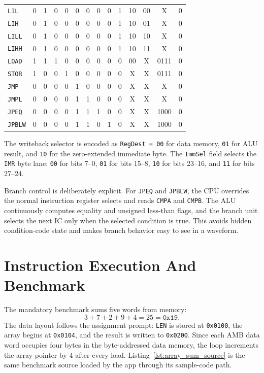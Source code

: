 \documentclass[12pt,a4paper]{article}
\begin{document}
\begin{table}[H]
{\begin{tabular}{lccccccccccccc}
\texttt{LIL}   & 0 & 1 & 0 & 0 & 0 & 0 & 0 & 0 & 1 & 10 & 00 & X    & 0 \\
\texttt{LIH}   & 0 & 1 & 0 & 0 & 0 & 0 & 0 & 0 & 1 & 10 & 01 & X    & 0 \\
\texttt{LILL}  & 0 & 1 & 0 & 0 & 0 & 0 & 0 & 0 & 1 & 10 & 10 & X    & 0 \\
\texttt{LIHH}  & 0 & 1 & 0 & 0 & 0 & 0 & 0 & 0 & 1 & 10 & 11 & X    & 0 \\
\texttt{LOAD}  & 1 & 1 & 1 & 0 & 0 & 0 & 0 & 0 & 0 & 00 & X  & 0111 & 0 \\
\texttt{STOR}  & 1 & 0 & 0 & 1 & 0 & 0 & 0 & 0 & 0 & X  & X  & 0111 & 0 \\
\texttt{JMP}   & 0 & 0 & 0 & 0 & 1 & 0 & 0 & 0 & 0 & X  & X  & X    & 0 \\
\texttt{JMPL}  & 0 & 0 & 0 & 0 & 1 & 1 & 0 & 0 & 0 & X  & X  & X    & 0 \\
\texttt{JPEQ}  & 0 & 0 & 0 & 0 & 1 & 1 & 1 & 0 & 0 & X  & X  & 1000 & 0 \\
\texttt{JPBLW} & 0 & 0 & 0 & 0 & 1 & 1 & 0 & 1 & 0 & X  & X  & 1000 & 0 \\
\bottomrule
\end{tabular}}
\label{tab:rtl_control}
\end{table}

\noindent The writeback selector is encoded as \texttt{RegDest = 00} for data memory, \texttt{01} for ALU result, and \texttt{10} for the zero-extended immediate byte. The \texttt{ImmSel} field selects the \texttt{IMR} byte lane: \texttt{00} for bits 7--0, \texttt{01} for bits 15--8, \texttt{10} for bits 23--16, and \texttt{11} for bits 27--24.

Branch control is deliberately explicit. For \texttt{JPEQ} and \texttt{JPBLW}, the CPU overrides the normal instruction register selects and reads \texttt{CMPA} and \texttt{CMPB}. The ALU continuously computes equality and unsigned less-than flags, and the branch unit selects the next IC only when the selected condition is true. This avoids hidden condition-code state and makes branch behavior easy to see in a waveform.

\section{Instruction Execution And Benchmark}

The mandatory benchmark sums five words from memory:
\[
3 + 7 + 2 + 9 + 4 = 25 = \texttt{0x19}.
\]
The data layout follows the assignment prompt: \texttt{LEN} is stored at \texttt{0x0100}, the array begins at \texttt{0x0104}, and the result is written to \texttt{0x0200}. Since each AMB data word occupies four bytes in the byte-addressed data memory, the loop increments the array pointer by 4 after every load. Listing~\ref{lst:array_sum_source} is the same benchmark source loaded by the app through its sample-code path.
\end{document}
